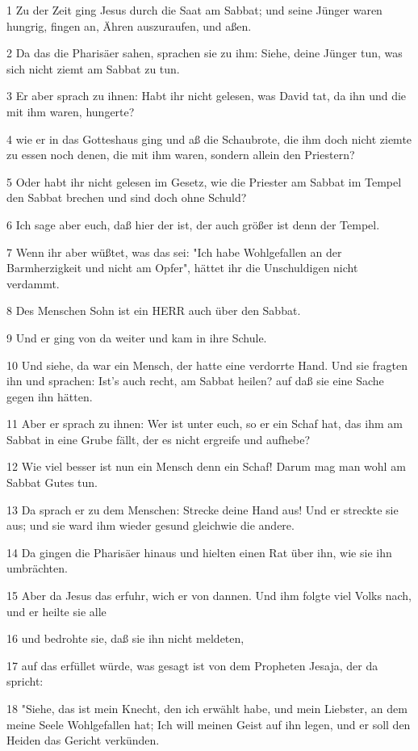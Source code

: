 \par 1 Zu der Zeit ging Jesus durch die Saat am Sabbat; und seine Jünger waren hungrig, fingen an, Ähren auszuraufen, und aßen.
\par 2 Da das die Pharisäer sahen, sprachen sie zu ihm: Siehe, deine Jünger tun, was sich nicht ziemt am Sabbat zu tun.
\par 3 Er aber sprach zu ihnen: Habt ihr nicht gelesen, was David tat, da ihn und die mit ihm waren, hungerte?
\par 4 wie er in das Gotteshaus ging und aß die Schaubrote, die ihm doch nicht ziemte zu essen noch denen, die mit ihm waren, sondern allein den Priestern?
\par 5 Oder habt ihr nicht gelesen im Gesetz, wie die Priester am Sabbat im Tempel den Sabbat brechen und sind doch ohne Schuld?
\par 6 Ich sage aber euch, daß hier der ist, der auch größer ist denn der Tempel.
\par 7 Wenn ihr aber wüßtet, was das sei: "Ich habe Wohlgefallen an der Barmherzigkeit und nicht am Opfer", hättet ihr die Unschuldigen nicht verdammt.
\par 8 Des Menschen Sohn ist ein HERR auch über den Sabbat.
\par 9 Und er ging von da weiter und kam in ihre Schule.
\par 10 Und siehe, da war ein Mensch, der hatte eine verdorrte Hand. Und sie fragten ihn und sprachen: Ist's auch recht, am Sabbat heilen? auf daß sie eine Sache gegen ihn hätten.
\par 11 Aber er sprach zu ihnen: Wer ist unter euch, so er ein Schaf hat, das ihm am Sabbat in eine Grube fällt, der es nicht ergreife und aufhebe?
\par 12 Wie viel besser ist nun ein Mensch denn ein Schaf! Darum mag man wohl am Sabbat Gutes tun.
\par 13 Da sprach er zu dem Menschen: Strecke deine Hand aus! Und er streckte sie aus; und sie ward ihm wieder gesund gleichwie die andere.
\par 14 Da gingen die Pharisäer hinaus und hielten einen Rat über ihn, wie sie ihn umbrächten.
\par 15 Aber da Jesus das erfuhr, wich er von dannen. Und ihm folgte viel Volks nach, und er heilte sie alle
\par 16 und bedrohte sie, daß sie ihn nicht meldeten,
\par 17 auf das erfüllet würde, was gesagt ist von dem Propheten Jesaja, der da spricht:
\par 18 "Siehe, das ist mein Knecht, den ich erwählt habe, und mein Liebster, an dem meine Seele Wohlgefallen hat; Ich will meinen Geist auf ihn legen, und er soll den Heiden das Gericht verkünden.
